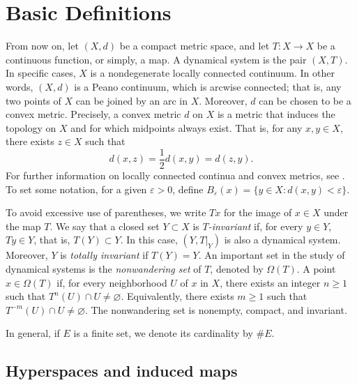 \documentclass[sn-mathphys-num]{sn-jnl}%
\theoremstyle{thmstyleone}%
\theoremstyle{thmstyletwo}%
\theoremstyle{thmstylethree}%
\begin{document}

\section{Basic Definitions}\label{sec:basic-def}

From now on, let $(X, d)$ be a compact metric space, and let $T: X \to X$ be a continuous function, or simply, a map. A dynamical system is the pair $(X, T)$. In specific cases, $X$ is a nondegenerate locally connected continuum. In other words, $(X, d)$ is a Peano continuum, which is arcwise connected; that is, any two points of $X$ can be joined by an arc in $X$. Moreover, $d$ can be chosen to be a convex metric. Precisely, a convex metric $d$ on $X$ is a metric that induces the topology on $X$ and for which midpoints always exist. That is, for any $x, y \in X$, there exists $z \in X$ such that
\begin{equation*}
    d(x, z)  = \frac{1}{2}d(x, y) = d(z, y).
\end{equation*}
For further information on locally connected continua and convex metrics, see \cite[Section 10]{illanes_nadler_1999}. To set some notation, for a given $\varepsilon > 0$, define $B_\varepsilon(x) = \{y \in X : d(x, y) < \varepsilon\}$. 

To avoid excessive use of parentheses, we write $Tx$ for the image of $x \in X$ under the map $T$. We say that a closed set $Y \subset X$ is \emph{$T$-invariant} if, for every $y \in Y$, $Ty \in Y$, that is, $T(Y) \subset Y$. In this case, $(Y, T|_Y)$ is also a dynamical system. Moreover, $Y$ is \emph{totally invariant} if $T(Y) = Y$. An important set in the study of dynamical systems is the \textit{nonwandering set} of $T$, denoted by $\Omega(T)$. A point $x \in \Omega(T)$ if, for every neighborhood $U$ of $x$ in $X$, there exists an integer $n \geq 1$ such that $T^n(U) \cap U \neq \varnothing$. Equivalently, there exists $m \geq 1$ such that $T^{-m}(U) \cap U \neq \varnothing$. The nonwandering set is nonempty, compact, and invariant.

In general, if $E$ is a finite set, we denote its cardinality by $\#E$.


\subsection{Hyperspaces and induced maps}\label{section:hyperspaces-induced-maps}
\end{document}
